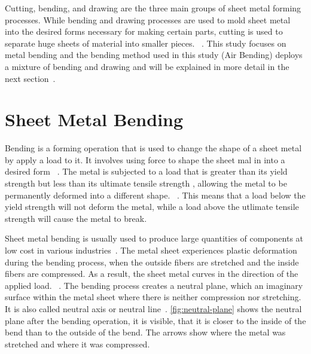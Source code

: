 Cutting, bending, and drawing are the three main groups of sheet metal forming processes.
While bending and drawing processes are used to mold sheet metal into the desired forms necessary for making certain
parts, cutting is used to separate huge sheets of material into smaller pieces.
~\cite[p. 405]{groover_fundamentalsmodernmanufacturing_2020}.
This study focuses on metal bending and the bending method used in this study (Air Bending) deploys a mixture of
bending and drawing and will be explained in more detail in the next
section~\cite[pp. 416]{groover_fundamentalsmodernmanufacturing_2020}.


\section{Sheet Metal Bending}\label{sec:bending}
Bending is a forming operation that is used to change the shape of a sheet metal by
apply a load to it.
It involves using force to shape the sheet mal in into a desired form
~\cite[p. 1]{dib_singleensembleclassifiers_2020}.
The metal is subjected to a load that is greater than its yield strength but less than its ultimate tensile strength
, allowing the metal to be permanently deformed into a different shape.
~\cite[p. 1]{baig_machinelearningprediction_2021}.
This means that a load below the yield strength will not deform the metal, while a load above the utlimate tensile
strength will cause the metal to break.

Sheet metal bending is usually used to produce large quantities of components at low cost in various
industries~\cite[p. 1]{dib_singleensembleclassifiers_2020}.
The metal sheet experiences plastic deformation during the bending process, when the outside fibers are stretched and
the inside fibers are compressed.
As a result, the sheet metal curves in the direction of the applied load.
~\cite[pp. 1--3]{baig_machinelearningprediction_2021}.
The bending process creates a neutral plane, which an imaginary surface within the metal sheet where there is
neither compression nor stretching.
It is also called neutral axis or neutral line~\cite[pp. 67]{gustafson1998analytical}.
\cref{fig:neutral-plane} shows the neutral plane after the bending operation, it is
visible, that it is closer to the inside of the bend than to the outside of the bend.
The arrows show where the metal was stretched and where it was compressed.

